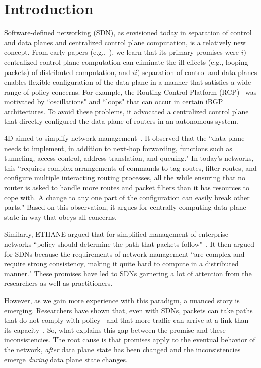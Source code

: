 \section{Introduction}
\label{sec:intro}

Software-defined networking (SDN), as envisioned today in separation of control and data planes and centralized control plane computation, is a relatively new concept.
From early papers (e.g.,~\cite{rcp-case,rcp,4d,ethane}), we learn that its primary promises were $i)$ centralized control plane computation can eliminate the ill-effects (e.g., looping packets) of distributed computation, and $ii)$ separation of control and data planes enables flexible configuration of the data plane in a manner that satisfies a wide range of policy concerns.
For example, the Routing Control Platform (RCP)~\cite{rcp-case,rcp} was motivated by ``oscillations" and ``loops" that can occur in certain iBGP architectures. To avoid these problems, it advocated a centralized control plane that directly configured the data plane of routers in an autonomous system.

4D aimed to simplify network management~\cite{4d}. It observed that the ``data plane needs to implement, in addition to next-hop forwarding, functions such as tunneling, access control, address translation, and queuing." In today's networks, this ``requires complex arrangements of commands to tag routes, filter routes, and configure multiple interacting routing processes, all the while ensuring that no router is asked to handle more routes and packet filters than it has resources to cope with. A change to any one part of the configuration can easily break other parts." Based on this observation, it argues for centrally computing data plane state in way that obeys all concerns.

Similarly, ETHANE argued that for simplified management of enterprise networks ``policy should determine the path that packets follow"~\cite{ethane}. It then argued for SDNs because the requirements of network management ``are complex and require strong consistency, making it quite hard to compute in a distributed manner." These promises have led to SDNs garnering a lot of attention from the researchers as well as practitioners.

However, as we gain more experience with this paradigm, a nuanced story is emerging.  Researchers have shown that, even with SDNs, packets can take paths that do not comply with policy~\cite{safeupdate,xx} and that more traffic can arrive at a link than its capacity~\cite{swan}. So, what explains this gap between the promise and these inconsistencies. The root cause is that promises apply to the eventual behavior of the network, {\em after} data plane state has been changed and the inconsistencies emerge {\em during} data plane state changes.

